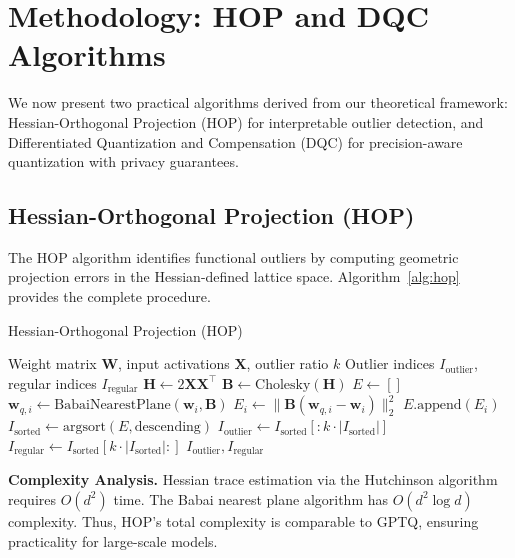 \documentclass[letterpaper,twocolumn,10pt]{article}
\begin{document}
\section{Methodology: HOP and DQC Algorithms}
\label{sec:method}

We now present two practical algorithms derived from our theoretical framework: Hessian-Orthogonal Projection (HOP) for interpretable outlier detection, and Differentiated Quantization and Compensation (DQC) for precision-aware quantization with privacy guarantees.

\subsection{Hessian-Orthogonal Projection (HOP)}

The HOP algorithm identifies functional outliers by computing geometric projection errors in the Hessian-defined lattice space. Algorithm~\ref{alg:hop} provides the complete procedure.

\begin{algorithm}
\caption{Hessian-Orthogonal Projection (HOP)}
\label{alg:hop}
\begin{algorithmic}[1]
\REQUIRE Weight matrix $\mathbf{W}$, input activations $\mathbf{X}$, outlier ratio $k$
\ENSURE Outlier indices $I_{\text{outlier}}$, regular indices $I_{\text{regular}}$
\STATE $\mathbf{H} \leftarrow 2\mathbf{X}\mathbf{X}^\top$ 
\STATE $\mathbf{B} \leftarrow \text{Cholesky}(\mathbf{H})$ 
\STATE $E \leftarrow []$ 
    \STATE $\mathbf{w}_{q,i} \leftarrow \text{BabaiNearestPlane}(\mathbf{w}_i, \mathbf{B})$
    \STATE $E_i \leftarrow \|\mathbf{B}(\mathbf{w}_{q,i} - \mathbf{w}_i)\|_2^2$ 
    \STATE $E.\text{append}(E_i)$
\ENDFOR
\STATE $I_{\text{sorted}} \leftarrow \text{argsort}(E, \text{descending})$
\STATE $I_{\text{outlier}} \leftarrow I_{\text{sorted}}[:k \cdot |I_{\text{sorted}}|]$
\STATE $I_{\text{regular}} \leftarrow I_{\text{sorted}}[k \cdot |I_{\text{sorted}}|:]$
\RETURN $I_{\text{outlier}}, I_{\text{regular}}$
\end{algorithmic}
\end{algorithm}

\textbf{Complexity Analysis.} Hessian trace estimation via the Hutchinson algorithm requires $O(d^2)$ time. The Babai nearest plane algorithm has $O(d^2 \log d)$ complexity. Thus, HOP's total complexity is comparable to GPTQ, ensuring practicality for large-scale models.
\end{document}
